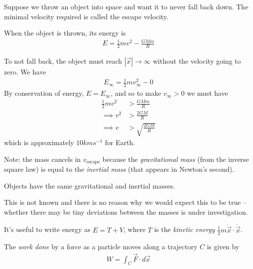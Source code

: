 \documentclass{../template/note}
\begin{document}
    \begin{example}
        Suppose we throw an object into space and want it to never fall back down. The minimal velocity required is called the escape velocity.

        When the object is thrown, its energy is
        \begin{align*}
            E = \frac{1}{2}mv^2 - \frac{GMm}{R}
        \end{align*}

        To not fall back, the object must reach \(|\vec x| \to \infty\) without the velocity going to zero. We have
        \begin{align*}
            E_\infty = \frac{1}{2}mv_{\infty}^2 - 0
        \end{align*}
        By conservation of energy, \(E = E_\infty\), and so to make \(v_\infty > 0\) we must have
        \begin{align*}
            \frac{1}{2}mv^2 &> \frac{GMm}{R} \\
            \implies v^2 &> \frac{2GM}{R} \\
            \implies v &> \sqrt{\frac{2GM}{R}}
        \end{align*}
        which is approximately \(10\si{kms^{-1}}\) for Earth.
        
        Note: the mass cancels in \(v_\text{escape}\) because the \emph{gravitational mass} (from the inverse square law) is equal to the \emph{inertial mass} (that appears in Newton's second).
    \end{example}
    
    \begin{proposition}
        Objects have the same gravitational and inertial masses.
    \end{proposition}

    \begin{remark*}
        This is not known and there is no reason why we would expect this to be true -- whether there may be tiny deviations between the masses is under investigation.
    \end{remark*}
    
    It's useful to write energy as \(E = T + V\), where \(T\) is the \emph{kinetic energy} \(\frac{1}{2}m \dot{\vec x} \cdot \dot{\vec x}\). 

    \begin{definition}
        The \emph{work done} by a force as a particle moves along a trajectory \(C\) is given by
        \begin{align*}
            W = \int_C \vec F \cdot d \vec x
        \end{align*}
    \end{definition}
    
\end{document}
